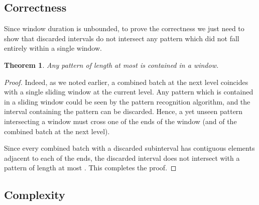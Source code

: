 \documentclass[runningheads,a4paper]{llncs}
\newtheorem{thm}{Theorem}
\begin{document}
\subsection{Correctness}

Since window duration is unbounded, to prove the correctness we just
need to show that discarded intervals do not intersect any
pattern which did not fall entirely within a single window.

\begin{thm}Any pattern of length at most  is contained in 
    a window.
\end{thm}
\begin{proof}Indeed, as we noted earlier, a combined batch at the next
    level coincides with a single sliding window at the current level.
    Any pattern which is contained in a sliding window could be
    seen by the pattern recognition algorithm, and the interval
    containing the pattern can be discarded. Hence, a yet unseen
    pattern intersecting a window must cross one of the ends of the
    window (and of the combined batch at the next level). 

    Since every combined batch with a discarded subinterval has
     contiguous elements adjacent to each of the ends, 
    the discarded interval does not intersect with a pattern of length
    at most . This completes the proof.
\end{proof}

\subsection{Complexity}
\end{document}
